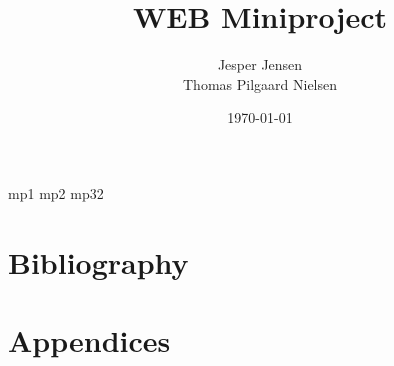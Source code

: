 \documentclass[twoside]{report}
\begin{document}
\pagestyle{empty} %
%
%
%
%

\title{WEB Miniproject}
\date{\today}
\author{Jesper Jensen \\ Thomas Pilgaard Nielsen}

\maketitle



{mp1}
{mp2}
{mp32}




\begingroup
	\part{Bibliography}
	
	\renewcommand{\addcontentsline}[3]{}%
	\renewcommand{\section}[2]{}%
	\renewcommand{\chapter}[2]{}%
	
	\label{biblo:mybiblio}
\endgroup

\appendix
	\part{Appendices}

\end{document}

